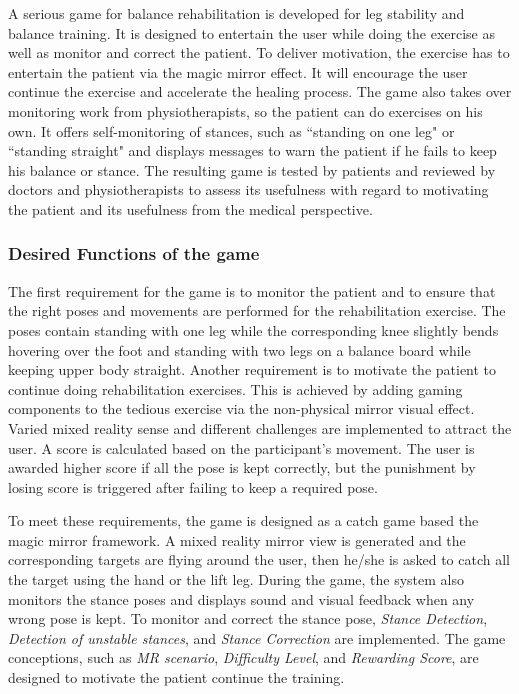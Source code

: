A serious game for balance rehabilitation is developed for leg stability and balance training. It is designed to entertain the user while doing the exercise as well as monitor and correct the patient. To deliver motivation, the exercise has to entertain the patient via the magic mirror effect. It will encourage the user continue the exercise and accelerate the healing process. The game also takes over monitoring work from physiotherapists, so the patient can do exercises on his own. It offers self-monitoring of stances, such as ``standing on one leg" or ``standing straight" and displays messages to warn the patient if he fails to keep his balance or stance.
The resulting game is tested by patients and reviewed by doctors and physiotherapists to assess its usefulness with regard to motivating the patient and its usefulness from the medical perspective.

\subsubsection{Desired Functions of the game}
The first requirement for the game is to monitor the patient and to ensure that the right poses and movements are performed for the rehabilitation exercise. The poses contain standing with one leg while the corresponding knee slightly bends hovering over the foot and standing with two legs on a balance board while keeping upper body straight.
Another requirement is to motivate the patient to continue doing rehabilitation exercises. This is achieved by adding gaming components to the tedious exercise via the non-physical mirror visual effect. Varied mixed reality sense and different challenges are implemented to attract the user. A score is calculated based on the participant's movement. The user is awarded higher score if all the pose is kept correctly, but the punishment by losing score is triggered after failing to keep a required pose.

To meet these requirements, the game is designed as a catch game based the magic mirror framework. A mixed reality mirror view is generated and the corresponding targets are flying around the user, then he/she is asked to catch all the target using the hand or the lift leg. During the game, the system also monitors the stance poses and displays sound and visual feedback when any wrong pose is kept. To monitor and correct the stance pose, \textit{Stance Detection}, \textit{Detection of unstable stances}, and \textit{Stance Correction} are implemented. The game conceptions, such as \textit{MR scenario}, \textit{Difficulty Level}, and \textit{Rewarding Score}, are designed to motivate the patient continue the training. 

